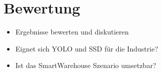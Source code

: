 \chapter{Bewertung}

\begin{itemize}
	\item Ergebnisse bewerten und diskutieren
	\item Eignet sich YOLO und SSD für die Industrie?
	\item Ist das SmartWarehouse Szenario umsetzbar?
\end{itemize}
